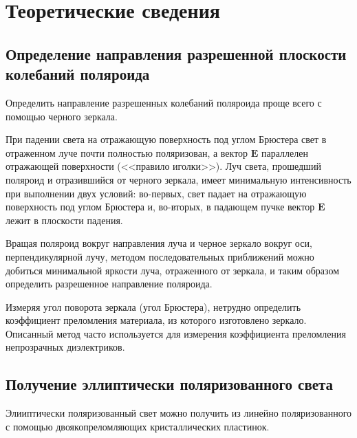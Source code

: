 \documentclass[a4paper,12pt]{article} %
\begin{document}
\section{Теоретические сведения}
\subsection{Определение направления разрешенной плоскости колебаний поляроида}
\hfill \break Определить направление разрешенных колебаний поляроида проще всего с помощью черного зеркала.

\hfill \break При падении света на отражающую поверхность под углом Брюстера свет в отраженном луче почти полностью поляризован, а вектор $\boldsymbol{E}$ параллелен отражающей поверхности (<<правило иголки>>). Луч света, прошедший поляроид и отразившийся от черного зеркала, имеет минимальную интенсивность при выполнении двух условий: во-первых, свет падает на отражающую поверхность под углом Брюстера и, во-вторых, в падающем пучке вектор $\boldsymbol{E}$ лежит в плоскости падения.

\hfill \break Вращая поляроид вокруг направления луча и черное зеркало вокруг оси, перпендикулярной лучу, методом последовательных приближений можно добиться минимальной яркости луча, отраженного от зеркала, и таким образом определить разрешенное направление поляроида.

\hfill \break Измеряя угол поворота зеркала (угол Брюстера), нетрудно определить коэффициент преломления материала, из которого изготовлено зеркало. Описанный метод часто используется для измерения коэффициента преломления непрозрачных диэлектриков.

\subsection{Получение эллиптически поляризованного света}
\hfill \break Элииптически поляризованный свет можно получить из линейно поляризованного с помощью двоякопреломляющих кристаллических пластинок.
\end{document}
